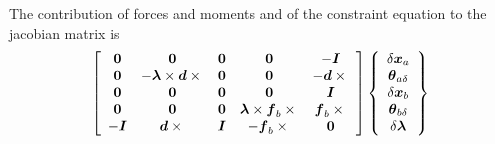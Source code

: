 \documentclass[10pt,dvips,fleqn,subeqn]{report}
\newcommand{\T}[1]{\boldsymbol{#1}}
\begin{document}
The contribution of forces and moments and of the constraint equation 
to the jacobian matrix is
\begin{equation}
	\sqbr{\matr{ccccc}{
		\T{0} & \T{0} & \T{0} & \T{0} & - \T{I} \\
		\T{0} & - \T{\lambda}\times\T{d}\times{} & \T{0} & \T{0} & - \T{d}\times{}\\
		\T{0} & \T{0} & \T{0} & \T{0} & \T{I} \\
		\T{0} & \T{0} & \T{0} & \T{\lambda}\times\T{f}_b\times{} & \T{f}_b\times{} \\
		- \T{I} & \T{d}\times{} & \T{I} & - \T{f}_b\times{} & \T{0}
	}}\cubr{\cvvect{
		\delta\T{x}_a \\
		\T{\theta}_{a\delta} \\
		\delta\T{x}_b \\
		\T{\theta}_{b\delta} \\
		\delta\T{\lambda}
	}}
\end{equation}
\end{document}
